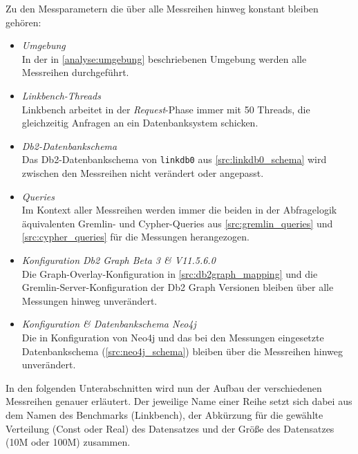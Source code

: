 Zu den Messparametern die über alle Messreihen hinweg konstant bleiben gehören:
\begin{itemize}
    \item \textit{Umgebung}\\
    In der in \autoref{analyse:umgebung} beschriebenen Umgebung werden alle Messreihen durchgeführt. 
    \item \textit{Linkbench-Threads}\\
    Linkbench arbeitet in der \textit{Request}-Phase immer mit 50 Threads, die gleichzeitig Anfragen an ein Datenbanksystem schicken.
    \item \textit{Db2-Datenbankschema}\\
    Das Db2-Datenbankschema von \texttt{linkdb0} aus \autoref{src:linkdb0_schema} wird zwischen den Messreihen nicht verändert oder angepasst. 
    \item \textit{Queries}\\
    Im Kontext aller Messreihen werden immer die beiden in der Abfragelogik äquivalenten Gremlin- und Cypher-Queries aus \autoref{src:gremlin_queries} und \autoref{src:cypher_queries} für die Messungen herangezogen. 
    \item \textit{Konfiguration Db2 Graph Beta 3 \& V11.5.6.0}\\
    Die Graph-Overlay-Konfiguration in \autoref{src:db2graph_mapping} und die Gremlin-Server-Konfiguration der Db2 Graph Versionen bleiben über alle Messungen hinweg unverändert.
    \item \textit{Konfiguration \& Datenbankschema Neo4j}\\
    Die in Konfiguration von Neo4j und das bei den Messungen eingesetzte Datenbankschema (\autoref{src:neo4j_schema}) bleiben über die Messreihen hinweg unverändert. 
\end{itemize}

In den folgenden Unterabschnitten wird nun der Aufbau der verschiedenen Messreihen genauer erläutert. Der jeweilige Name einer Reihe setzt sich dabei aus dem Namen des Benchmarks (Linkbench), der Abkürzung für die gewählte Verteilung (Const oder Real) des Datensatzes und der Größe des Datensatzes (10M oder 100M) zusammen.

